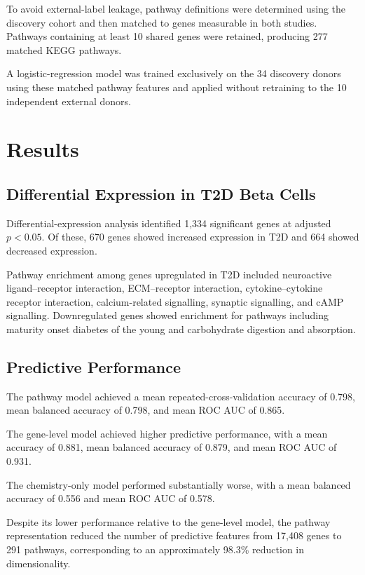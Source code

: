 \documentclass[conference]{IEEEtran}
\begin{document}
To avoid external-label leakage, pathway definitions were determined using the discovery cohort and then matched to genes measurable in both studies. Pathways containing at least 10 shared genes were retained, producing 277 matched KEGG pathways.

A logistic-regression model was trained exclusively on the 34 discovery donors using these matched pathway features and applied without retraining to the 10 independent external donors.

\section{Results}

\subsection{Differential Expression in T2D Beta Cells}

Differential-expression analysis identified 1,334 significant genes at adjusted $p<0.05$. Of these, 670 genes showed increased expression in T2D and 664 showed decreased expression.

Pathway enrichment among genes upregulated in T2D included neuroactive ligand--receptor interaction, ECM--receptor interaction, cytokine--cytokine receptor interaction, calcium-related signalling, synaptic signalling, and cAMP signalling. Downregulated genes showed enrichment for pathways including maturity onset diabetes of the young and carbohydrate digestion and absorption.

\subsection{Predictive Performance}

The pathway model achieved a mean repeated-cross-validation accuracy of 0.798, mean balanced accuracy of 0.798, and mean ROC AUC of 0.865.

The gene-level model achieved higher predictive performance, with a mean accuracy of 0.881, mean balanced accuracy of 0.879, and mean ROC AUC of 0.931.

The chemistry-only model performed substantially worse, with a mean balanced accuracy of 0.556 and mean ROC AUC of 0.578.

Despite its lower performance relative to the gene-level model, the pathway representation reduced the number of predictive features from 17,408 genes to 291 pathways, corresponding to an approximately 98.3\% reduction in dimensionality.
\end{document}
